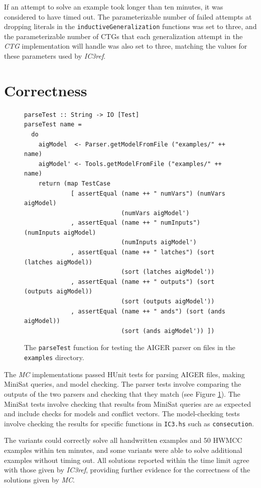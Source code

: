 \documentclass[12pt,a4paper,twoside,openright]{report}
\begin{document}
{{If an attempt to solve an example took longer than ten minutes, it was considered to have timed out.
The parameterizable number of failed attempts
at dropping literals in the \verb,inductiveGeneralization, functions was set to
three, and the parameterizable number of CTGs that each generalization attempt
in the {\it CTG} implementation will handle was also set to three, matching the
values for these parameters used by \emph{IC3ref}.

\section{Correctness}
\label{eval:solving}

\begin{figure}[t]
\begin{lstlisting}
parseTest :: String -> IO [Test]
parseTest name =
  do
    aigModel  <- Parser.getModelFromFile ("examples/" ++ name)
    aigModel' <- Tools.getModelFromFile ("examples/" ++ name)
    return (map TestCase
             [ assertEqual (name ++ " numVars") (numVars aigModel)
                           (numVars aigModel')
             , assertEqual (name ++ " numInputs") (numInputs aigModel)
                           (numInputs aigModel')
             , assertEqual (name ++ " latches") (sort (latches aigModel))
                           (sort (latches aigModel'))
             , assertEqual (name ++ " outputs") (sort (outputs aigModel))
                           (sort (outputs aigModel'))
             , assertEqual (name ++ " ands") (sort (ands aigModel))
                           (sort (ands aigModel')) ])
\end{lstlisting}
\caption{The {\tt parseTest} function for testing the AIGER parser on files in the {\tt examples} directory.}
\label{parseTest}
\end{figure}

The \emph{MC} implementations passed HUnit tests for parsing AIGER files,
making MiniSat queries, and model checking. The parser tests involve comparing
the outputs of the two parsers and checking that they match (see Figure
\ref{parseTest}). The MiniSat tests
involve checking that results from MiniSat queries are as expected and include checks
for models and conflict
vectors. The model-checking tests involve checking the results for specific
functions in \verb,IC3.hs, such as \verb,consecution,.

The variants could correctly solve all handwritten examples and 50 HWMCC examples
within ten minutes, and some
variants were able to solve additional examples without timing out.
All solutions reported within the time limit agree with those
given by \emph{IC3ref}, providing further evidence for the correctness of the solutions given
by \emph{MC}.

}}
\end{document}
